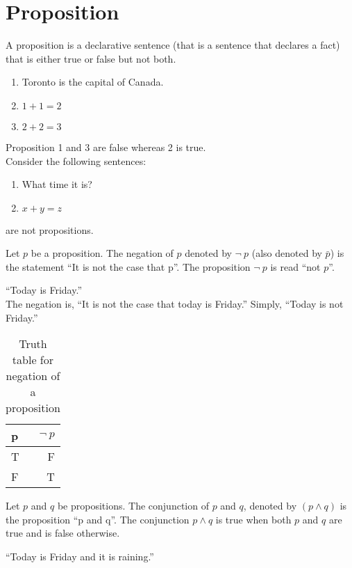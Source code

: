 \documentclass[../main-sheet.tex]{subfiles}
\begin{document}
\section{Proposition}
\begin{defn}[Proposition]
    A proposition is a declarative sentence (that is a sentence that declares a fact) that is either true or false but not both.
\end{defn}
\begin{ex}
    \hfill
    \begin{enumerate}
        \item Toronto is the capital of Canada.
        \item \(1+1=2\)
        \item $2+2=3$
    \end{enumerate}
    Proposition 1 and 3 are false whereas 2 is true.\\
    Consider the following sentences:
    \begin{enumerate}
        \item What time it is?
        \item $x+y=z$
    \end{enumerate}
    are not propositions.
\end{ex}
\begin{defn}[Negation of $ p $]
    Let $p$ be a proposition.
    The negation of $p$ denoted by $\neg\ p$ (also denoted by $\bar{p}$) is the statement ``It is not the case that p''.
    The proposition $\neg\ p$ is read ``not $p$''.
\end{defn}
``Today is Friday.'' \\
The negation is, ``It is not the case that today is Friday.''
Simply, ``Today is not Friday.''
\begin{table}[H]
    \centering
    \begin{tabular}{lr}
        \toprule
        p & \(\neg\ p\) \\ \midrule
        T & F           \\ 
        F & T           \\ \bottomrule
    \end{tabular}
    \caption{Truth table for negation of a proposition}
\end{table}
\begin{defn}
    Let \(p\) and \(q\) be propositions. The conjunction of \(p\) and \(q\), denoted by \((p\wedge q)\) is the proposition ``p and q''. The conjunction \(p\wedge q\) is true when both \(p\) and \(q\) are true and is false otherwise.
\end{defn}
``Today is Friday and it is raining.''
\end{document}
